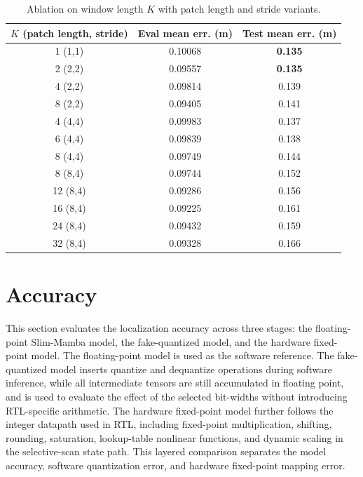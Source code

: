 \documentclass[11pt,twoside]{eitExjobb}
\begin{document}
\begin{table}[H]
\centering
\caption{Ablation on window length \(K\) with patch length and stride variants.}
\label{tab:k_ablation}
\footnotesize
\setlength{\tabcolsep}{5pt}
\renewcommand{\arraystretch}{1.12}
\begin{tabular}{c c c}
\hline
\textbf{\(K\) (patch length, stride)} & \textbf{Eval mean err. (m)} &
\textbf{Test mean err. (m)} \\
\hline
1  (1,1) & 0.10068 & \textbf{0.135} \\
2  (2,2) & 0.09557 & \textbf{0.135} \\
4  (2,2) & 0.09814 & 0.139 \\
8  (2,2) & 0.09405 & 0.141 \\
4  (4,4) & 0.09983 & 0.137 \\
6  (4,4) & 0.09839 & 0.138 \\
8  (4,4) & 0.09749 & 0.144 \\
8  (8,4) & 0.09744 & 0.152 \\
12 (8,4) & 0.09286 & 0.156 \\
16 (8,4) & 0.09225 & 0.161 \\
24 (8,4) & 0.09432 & 0.159 \\
32 (8,4) & 0.09328 & 0.166 \\
\hline
\end{tabular}
\end{table}

\section{Accuracy}

This section evaluates the localization accuracy across three stages: the
floating-point Slim-Mamba model, the fake-quantized model, and the hardware fixed-point
model. The floating-point model is used as the software reference. The fake-quantized
model inserts quantize and dequantize operations during software inference, while all
intermediate tensors are still accumulated in floating point, and is used to evaluate
the effect of the selected bit-widths without introducing RTL-specific arithmetic. The
hardware fixed-point model
further follows the integer datapath used in RTL, including fixed-point multiplication,
shifting, rounding, saturation, lookup-table nonlinear functions, and dynamic scaling in
the selective-scan state path. This layered comparison separates the model accuracy,
software quantization error, and hardware fixed-point mapping error.
\end{document}
